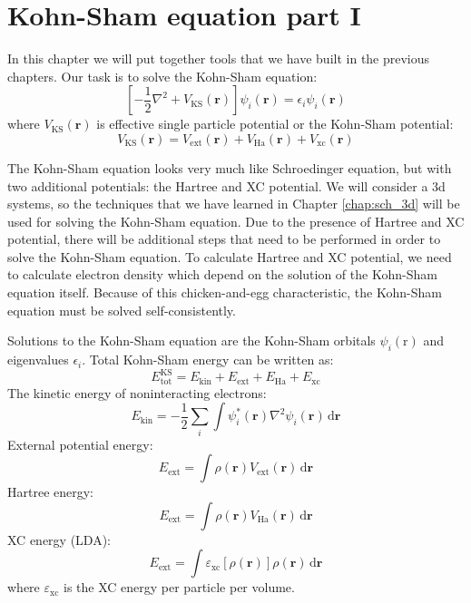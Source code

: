 \chapter{Kohn-Sham equation part I}

In this chapter we will put together tools that we have built in the previous chapters.
Our task is to solve the Kohn-Sham equation:
\begin{equation}
\left[ -\frac{1}{2}\nabla^2 + V_{\mathrm{KS}}(\mathbf{r}) \right]
\psi_{i}(\mathbf{r}) = \epsilon_{i} \psi_{i}(\mathbf{r})
\end{equation}
where $V_{\mathrm{KS}}(\mathbf{r})$ is effective single
particle potential or
the Kohn-Sham potential:
\begin{equation}
V_{\mathrm{KS}}(\mathbf{r}) =
V_{\mathrm{ext}}(\mathbf{r}) + V_{\mathrm{Ha}}(\mathbf{r}) + V_{\mathrm{xc}}(\mathbf{r})
\label{eq:KS_pot_local}
\end{equation}

The Kohn-Sham equation looks very much like Schroedinger equation, but with two additional
potentials: the Hartree and XC potential.
We will consider a 3d systems, so the techniques
that we have learned in Chapter \ref{chap:sch_3d} will be used for solving the
Kohn-Sham equation. Due to the presence of Hartree and XC potential, there will be additional
steps that need to be performed in order to solve the Kohn-Sham equation.
To calculate Hartree and XC potential, we need to calculate electron density which depend
on the solution of the Kohn-Sham equation itself. Because of this chicken-and-egg
characteristic, the Kohn-Sham equation must be solved self-consistently.

Solutions to the Kohn-Sham equation are the Kohn-Sham orbitals
$\psi_{i}(\mathrm{r})$ and eigenvalues $\epsilon_{i}$.
Total Kohn-Sham energy can be written as:
\begin{equation}
E^{\mathrm{KS}}_{\mathrm{tot}} = E_{\mathrm{kin}} + E_{\mathrm{ext}}
+ E_{\mathrm{Ha}} + E_{\mathrm{xc}}
\end{equation}
%
The kinetic energy of noninteracting electrons:
\begin{equation}
E_{\mathrm{kin}} = -\frac{1}{2}\sum_{i} \int \psi_{i}^{*}(\mathbf{r}) \nabla^2 \psi_{i}(\mathbf{r})
\,\mathrm{d}\mathbf{r}
\end{equation}
%
External potential energy:
\begin{equation}
E_{\mathrm{ext}} = \int \rho(\mathbf{r}) V_{\mathrm{ext}}(\mathbf{r})
\,\mathrm{d}\mathbf{r}
\end{equation}
%
Hartree energy:
\begin{equation}
E_{\mathrm{ext}} = \int \rho(\mathbf{r}) V_{\mathrm{Ha}}(\mathbf{r})
\,\mathrm{d}\mathbf{r}
\end{equation}
%
XC energy (LDA):
\begin{equation}
E_{\mathrm{ext}} = \int \varepsilon_{\mathrm{xc}}[\rho(\mathbf{r})] \rho(\mathbf{r})
\,\mathrm{d}\mathbf{r}
\end{equation}
where $\varepsilon_{\mathrm{xc}}$ is the XC energy per particle per volume.

